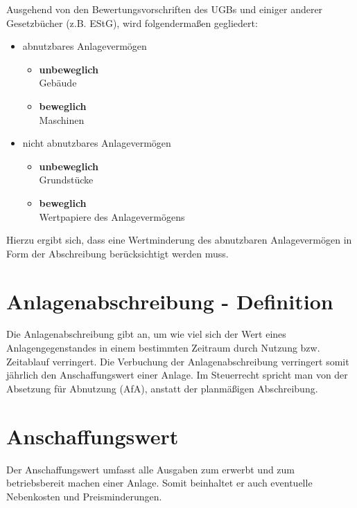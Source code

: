 \documentclass[a4paper,10pt]{report}
\begin{document}
Ausgehend von den Bewertungsvorschriften des UGBs und einiger anderer
Gesetzbücher (z.B. EStG), wird folgendermaßen gegliedert:
\begin{itemize}
  \item abnutzbares Anlagevermögen
    \begin{itemize}
      \item {
          \textbf{unbeweglich}\\
          Gebäude
        }
      \item {
          \textbf{beweglich}\\
          Maschinen
        }
    \end{itemize}
  \item nicht abnutzbares Anlagevermögen
    \begin{itemize}
      \item {
          \textbf{unbeweglich}\\
          Grundstücke
        }
      \item {
          \textbf{beweglich}\\
          Wertpapiere des Anlagevermögens
        }
    \end{itemize}
\end{itemize}

Hierzu ergibt sich, dass eine Wertminderung des abnutzbaren
Anlagevermögen in Form der Abschreibung berücksichtigt werden muss.

\section{Anlagenabschreibung - Definition}
Die Anlagenabschreibung gibt an, um wie viel sich der Wert eines
Anlagengegenstandes in einem bestimmten Zeitraum durch Nutzung
bzw. Zeitablauf verringert. Die Verbuchung der Anlagenabschreibung
verringert somit jährlich den Anschaffungswert einer Anlage. Im
Steuerrecht spricht man von der Absetzung für Abnutzung (AfA), anstatt
der planmäßigen Abschreibung.

\section{Anschaffungswert}
Der Anschaffungswert umfasst alle Ausgaben zum erwerbt und zum
betriebsbereit machen einer Anlage. Somit beinhaltet er auch
eventuelle Nebenkosten und Preisminderungen.
\end{document}
